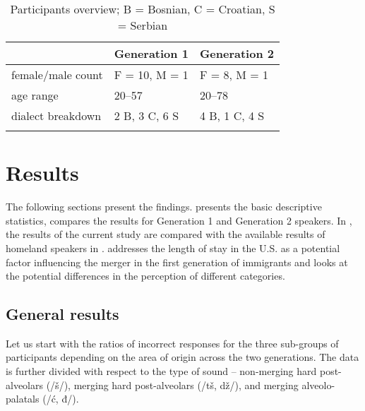 \documentclass[output=paper,modfonts,newtxmath,hidelinks,]{langscibook}
\begin{document}
\begin{table}
\begin{tabularx}{\textwidth}{XXl}
\lsptoprule
&  \textbf{Generation 1} &  \textbf{Generation 2}\\
\midrule
female/male count & F = 10, M = 1 & F = 8, M = 1\\
age range & 20--57 & 20--78\\
dialect breakdown & 2 B, 3 C, 6 S & 4 B, 1 C, 4 S\\
\lspbottomrule
\end{tabularx}
\caption{\label{tab:mihajlovic:4} Participants overview; B = Bosnian, C = Croatian, S = Serbian}
\end{table}

\section{Results}\label{sec:mihajlovic:5}

The following sections present the findings.  presents the basic descriptive statistics,  compares the results for Generation 1 and Generation 2 speakers. In , the results of the current study are compared with the available results of homeland speakers in \citet{Cavar-Hamann2011}.  addresses the length of stay in the U.S. as a potential factor influencing the merger in the first generation of immigrants and  looks at the potential differences in the perception of different categories.


\subsection{General results}\label{sec:mihajlovic:5.1}

Let us start with the ratios of incorrect responses for the three sub-groups of participants depending on the area of origin across the two generations. The data is further divided with respect to the type of sound – non-merging hard post-alveolars (/š/), merging hard post-alveolars (/tš, dž/), and merging alveolo-palatals (/ć, đ/).
\end{document}
